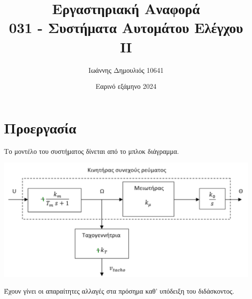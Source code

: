 \documentclass[12pt]{article}
\title{\vspace{-2cm} Εργαστηριακή Αναφορά\\ 
         \large 031 - Συστήματα Αυτομάτου Ελέγχου ΙΙ}
\author{Ιωάννης Δημουλιός 10641}
\date{Εαρινό εξάμηνο 2024}
\begin{document}
\maketitle

\section*{Προεργασία}
Το μοντέλο του συστήματος δίνεται από το μπλοκ διάγραμμα. 
\begin{center}
        \includegraphics*[scale=0.3]{system_model.png}
\end{center}
Έχουν γίνει οι απαραίτητες αλλαγές στα πρόσημα καθ' υπόδειξη του διδάσκοντος. 
\end{document}
